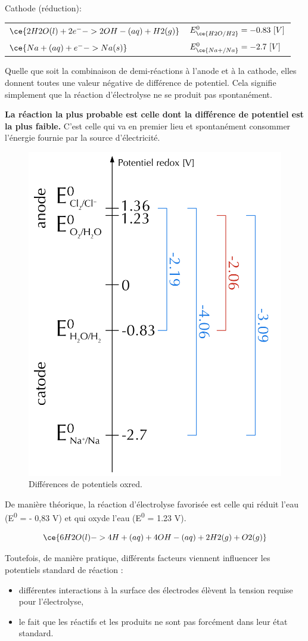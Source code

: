 \documentclass[
  11pt,
  a4paper,
  openany]{book}
\providecommand{\tightlist}{%
  \setlength{\itemsep}{0pt}\setlength{\parskip}{0pt}}
\begin{document}
\clearpage

Cathode (réduction):

\begin{longtable}[]{@{}
  >{\centering\arraybackslash}p{}
  >{\raggedright\arraybackslash}p{}@{}}
\toprule()
\endhead
\(\ce{2H2O(l) + 2 e^- -> 2OH-(aq) + H2(g)}\) & \(E^0_{\ce{H2O/H2}} = -0.83\ [V]\) \\
\(\ce{Na+(aq) + e^- -> Na(s)}\) & \(E^0_{\ce{Na+/Na}} = -2.7\ [V]\) \\
\bottomrule()
\end{longtable}

Quelle que soit la combinaison de demi-réactions à l'anode et à la cathode, elles donnent toutes une valeur négative de différence de potentiel. Cela signifie simplement que la réaction d'électrolyse ne se produit pas spontanément.

\textbf{La réaction la plus probable est celle dont la différence de potentiel est la plus faible.} C'est celle qui va en premier lieu et spontanément consommer l'énergie fournie par la source d'électricité.

\begin{figure}

{\centering \includegraphics[width=0.25\linewidth]{images/electrolysis-potentials} 

}

\caption{Différences de potentiels oxred.}\label{fig:electrolysis-potentials}
\end{figure}

De manière théorique, la réaction d'électrolyse favorisée est celle qui réduit l'eau (E\textsuperscript{0} = - 0,83 V) et qui oxyde l'eau (E\textsuperscript{0} = 1.23 V).

\[
\ce{6 H2O(l) -> 4 H+(aq) + 4 OH-(aq) + 2 H2(g) + O2(g)}
\]

Toutefois, de manière pratique, différents facteurs viennent influencer les potentiels standard de réaction :

\begin{itemize}
\tightlist
\item
  différentes interactions à la surface des électrodes élèvent la tension requise pour l'électrolyse,
\item
  le fait que les réactifs et les produits ne sont pas forcément dans leur état standard.
\end{itemize}
\end{document}
